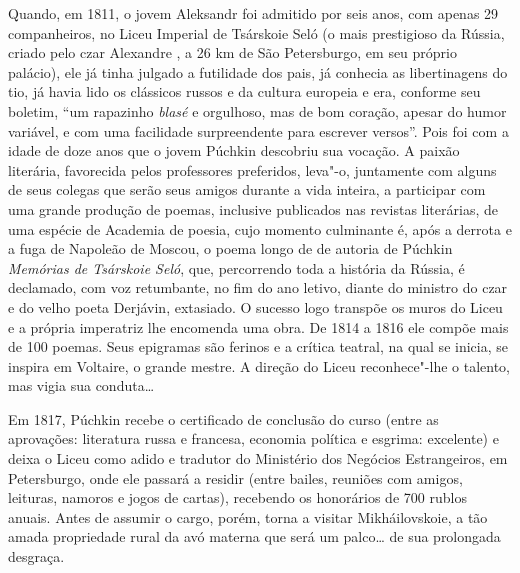 Quando, em 1811, o jovem Aleksandr foi admitido por seis anos, com apenas
29 companheiros, no Liceu Imperial de Tsárskoie Seló (o mais
prestigioso da Rússia, criado pelo czar Alexandre , a 26 km de São
Petersburgo, em seu próprio palácio), ele já tinha julgado a futilidade
dos pais, já conhecia as libertinagens do tio, já havia lido os
clássicos russos e da cultura europeia e era, conforme seu boletim, ``um
rapazinho \emph{blasé} e orgulhoso, mas de bom coração, apesar do humor
variável, e com uma facilidade surpreendente para escrever versos''.
Pois foi com a idade de doze anos que o jovem Púchkin descobriu sua
vocação. A paixão literária, favorecida pelos professores preferidos,
leva"-o, juntamente com alguns de seus colegas que serão seus amigos
durante a vida inteira, a participar com uma grande produção de poemas,
inclusive publicados nas revistas literárias, de uma espécie de Academia
de poesia, cujo momento culminante é, após a derrota e a fuga de
Napoleão de Moscou, o poema longo de de autoria de Púchkin \emph{Memórias de
Tsárskoie Seló}, que, percorrendo toda a história da Rússia, é declamado, com voz retumbante, no fim do ano letivo, diante do
ministro do czar e do velho poeta Derjávin, extasiado. O sucesso logo
transpõe os muros do Liceu e a própria imperatriz lhe encomenda uma
obra. De 1814 a 1816 ele compõe mais de 100 poemas. Seus epigramas são
ferinos e a crítica teatral, na qual se inicia, se inspira em Voltaire, o
grande mestre. A direção do Liceu reconhece"-lhe o talento, mas vigia sua
conduta\ldots{}

Em 1817, Púchkin recebe o certificado de conclusão do curso (entre as
aprovações: literatura russa e francesa, economia política e esgrima:
excelente) e deixa o Liceu como adido e tradutor do Ministério
dos Negócios Estrangeiros, em Petersburgo, onde ele passará a residir
(entre bailes, reuniões com amigos, leituras, namoros e jogos de
cartas), recebendo os honorários de 700 rublos anuais. Antes de assumir
o cargo, porém, torna a visitar Mikháilovskoie, a tão amada propriedade
rural da avó materna que será um palco\ldots{} de sua prolongada desgraça.

